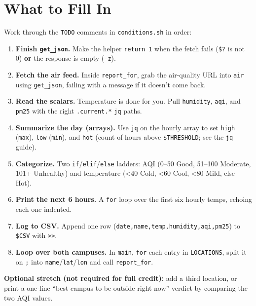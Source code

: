 \documentclass[11pt]{article}
\begin{document}
\section{What to Fill In}
Work through the \texttt{TODO} comments in \texttt{conditions.sh} in order:
\begin{enumerate}
    \item \textbf{Finish \texttt{get\_json}.} Make the helper \texttt{return 1} when the fetch fails (\texttt{\$?} is not 0) \textbf{or} the response is empty (\texttt{-z}).
    \item \textbf{Fetch the air feed.} Inside \texttt{report\_for}, grab the air-quality URL into \texttt{air} using \texttt{get\_json}, failing with a message if it doesn't come back.
    \item \textbf{Read the scalars.} Temperature is done for you. Pull \texttt{humidity}, \texttt{aqi}, and \texttt{pm25} with the right \texttt{.current.*} \texttt{jq} paths.
    \item \textbf{Summarize the day (arrays).} Use \texttt{jq} on the hourly array to set \texttt{high} (\texttt{max}), \texttt{low} (\texttt{min}), and \texttt{hot} (count of hours above \texttt{\$THRESHOLD}; see the \texttt{jq} guide).
    \item \textbf{Categorize.} Two \texttt{if}/\texttt{elif}/\texttt{else} ladders: AQI (0--50 Good, 51--100 Moderate, 101+ Unhealthy) and temperature (\textless40 Cold, \textless60 Cool, \textless80 Mild, else Hot).
    \item \textbf{Print the next 6 hours.} A \texttt{for} loop over the first six hourly temps, echoing each one indented.
    \item \textbf{Log to CSV.} Append one row (\texttt{date,name,temp,humidity,aqi,pm25}) to \texttt{\$CSV} with \texttt{>{}>}.
    \item \textbf{Loop over both campuses.} In \texttt{main}, \texttt{for} each entry in \texttt{LOCATIONS}, split it on \texttt{;} into \texttt{name}/\texttt{lat}/\texttt{lon} and call \texttt{report\_for}.
\end{enumerate}
\textbf{Optional stretch (not required for full credit):} add a third location, or print a one-line ``best campus to be outside right now'' verdict by comparing the two AQI values.

\end{document}
